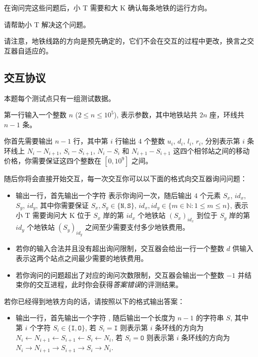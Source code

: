 在询问完这些问题后，小 T 需要和大 K 确认每条地铁的运行方向。

请帮助小 T 解决这个问题。

请注意，地铁线路的方向是预先确定的，它们不会在交互的过程中更改，换言之交互器自适应的。

\subsection{交互协议}

本题每个测试点只有一组测试数据。

第一行输入一个整数 $n$ ($2 \le n \le 10^5$), 表示参数，其中地铁站共 $2n$ 座，环线共 $n - 1$ 条。

你首先需要输出 $n - 1$ 行，其中第 $i$ 行输出 $4$ 个整数 $u_i$, $d_i$, $l_i$, $r_i$, 分别表示第 $i$ 条环线上 $N_i - N_{i + 1}$, $S_i - S_{i + 1}$, $N_i - S_i$ 和 $N_{i + 1} - S_{i + 1}$ 这四个相邻站之间的移动价格，你需要保证这四个整数在 $[0, 10^9]$ 之间。

随后你将会直接开始交互，每一次交互你可以以下面的格式向交互器询问问题：

\begin{itemize}
   \item 输出一行，首先输出一个字符  表示你询问一次，随后输出 $4$ 个元素 $S_x$, $id_x$, $S_y$, $id_y$, 其中你需要保证 $S_x, S_y \in \{\mathtt{N}, \mathtt{S}\}$, $id_x, id_y \in \{m \in \mathbb{N} : 1 \le m \le n\}$, 表示小 T 需要询问大 K 位于 $S_x$ 岸的第 $id_x$ 个地铁站 $(S_x)_{id_x}$ 到位于 $S_y$ 岸的第 $id_y$ 个地铁站 $(S_y)_{id_y}$ 之间至少需要支付多少地铁费用。
   \item 若你的输入合法并且没有超出询问限制，交互器会给出一行一个整数 $d$ 供输入表示这两个站点之间最少需要的地铁费用。
   \item 若你询问的问题超出了对应的询问次数限制，交互器会输出一个整数 $-1$ 并结束你的交互进程，此时你会获得\textit{答案错误}的评测结果。
\end{itemize}

若你已经得到地铁方向的话，请按照以下的格式输出答案：

\begin{itemize}
   \item 输出一行，首先输出一个字符 \TT{!}, 随后输出一个长度为 $n - 1$ 的字符串 $S$, 其中第 $i$ 个字符 $S_i \in \{\mathtt{I}, \mathtt{O}\}$, 若 $S_i = \mathtt{I}$ 则表示第 $i$ 条环线的方向为 $N_i \leftarrow N_{i + 1} \leftarrow S_{i + 1} \leftarrow S_i \leftarrow N_i$, 若 $S_i = \mathtt{O}$ 则表示第 $i$ 条环线的方向为 $N_i \rightarrow N_{i + 1} \rightarrow S_{i + 1} \rightarrow S_i \rightarrow N_i$.
\end{itemize}


